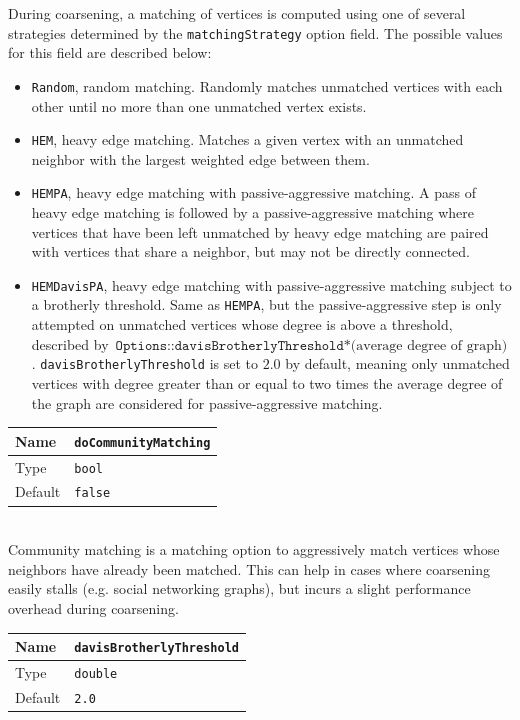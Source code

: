 \documentclass[letter]{article}
\begin{document}
During coarsening, a matching of vertices is computed using one of several strategies determined by the \texttt{matchingStrategy} option field. The possible values for this field are described below:

\begin{itemize}
\item \texttt{Random}, random matching. Randomly matches unmatched vertices with each other until no more than one unmatched vertex exists.
\item \texttt{HEM}, heavy edge matching. Matches a given vertex with an unmatched neighbor with the largest weighted edge between them.
\item \texttt{HEMPA}, heavy edge matching with passive-aggressive matching. A pass of heavy edge matching is followed by a passive-aggressive matching where vertices that have been left unmatched by heavy edge matching are paired with vertices that share a neighbor, but may not be directly connected.
\item \texttt{HEMDavisPA}, heavy edge matching with passive-aggressive matching subject to a brotherly threshold. Same as \texttt{HEMPA}, but the passive-aggressive step is only attempted on unmatched vertices whose degree is above a threshold, described by $\texttt{Options::davisBrotherlyThreshold}*\text{(average degree of graph)}$. \texttt{davisBrotherlyThreshold} is set to $2.0$ by default, meaning only unmatched vertices with degree greater than or equal to two times the average degree of the graph are considered for passive-aggressive matching.
\end{itemize}

\baselineskip
\begin{tabular}{|l|l|} \hline
Name & \texttt{doCommunityMatching} \\ \hline
Type & \texttt{bool} \\ \hline
Default & \texttt{false} \\ \hline
\end{tabular}\\

Community matching is a matching option to aggressively match vertices whose neighbors have already been matched. This can help in cases where coarsening easily stalls (e.g. social networking graphs), but incurs a slight performance overhead during coarsening.

\baselineskip
\begin{tabular}{|l|l|} \hline
Name & \texttt{davisBrotherlyThreshold} \\ \hline
Type & \texttt{double} \\ \hline
Default & \texttt{2.0} \\ \hline
\end{tabular}\\
\end{document}
